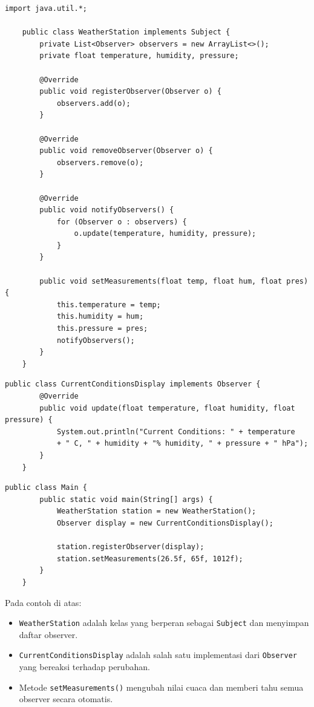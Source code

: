 \begin{lstlisting}[style=JavaStyle, caption={Kelas WeatherStation sebagai Subject}]
	import java.util.*;
	
	public class WeatherStation implements Subject {
		private List<Observer> observers = new ArrayList<>();
		private float temperature, humidity, pressure;
		
		@Override
		public void registerObserver(Observer o) {
			observers.add(o);
		}
		
		@Override
		public void removeObserver(Observer o) {
			observers.remove(o);
		}
		
		@Override
		public void notifyObservers() {
			for (Observer o : observers) {
				o.update(temperature, humidity, pressure);
			}
		}
		
		public void setMeasurements(float temp, float hum, float pres) {
			this.temperature = temp;
			this.humidity = hum;
			this.pressure = pres;
			notifyObservers();
		}
	}
\end{lstlisting}

\begin{lstlisting}[style=JavaStyle, caption={Observer: CurrentConditionsDisplay}]
	public class CurrentConditionsDisplay implements Observer {
		@Override
		public void update(float temperature, float humidity, float pressure) {
			System.out.println("Current Conditions: " + temperature 
			+ " C, " + humidity + "% humidity, " + pressure + " hPa");
		}
	}
\end{lstlisting}

\begin{lstlisting}[style=JavaStyle, caption={Client: Main}]
	public class Main {
		public static void main(String[] args) {
			WeatherStation station = new WeatherStation();
			Observer display = new CurrentConditionsDisplay();
			
			station.registerObserver(display);
			station.setMeasurements(26.5f, 65f, 1012f);
		}
	}
\end{lstlisting}

Pada contoh di atas:
\begin{itemize}
	\item \texttt{WeatherStation} adalah kelas yang berperan sebagai \texttt{Subject} dan menyimpan daftar observer.
	\item \texttt{CurrentConditionsDisplay} adalah salah satu implementasi dari \texttt{Observer} yang bereaksi terhadap perubahan.
	\item Metode \texttt{setMeasurements()} mengubah nilai cuaca dan memberi tahu semua observer secara otomatis.
\end{itemize}

